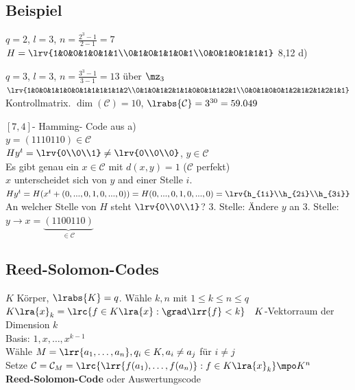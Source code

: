 	\subsection{Beispiel}
			\item $ q=2 $, $ l=3 $, $ n=\frac{2^3-1}{2-1}=7 $\\
				$ H=\lrv{1&0&0&1&0&1&1\\0&1&0&1&1&0&1\\0&0&1&0&1&1&1} $ 8,12 d)
			\item $ q=3 $, $l=3$, $n=\frac{3^3-1}{3-1}=13$ über $ \mz_3 $\\
				$ \lrv{1&0&0&1&1&0&0&1&1&1&1&1&2\\0&1&0&1&2&1&1&0&0&1&1&2&1\\0&0&1&0&0&1&2&1&2&1&2&1&1} $ Kontrollmatrix. $ \dim(\mathcal{C})=10 $, $ \lrabs{\mathcal{C}}=3^{30}=59.049 $
			\item  $ [7,4] $- Hamming- Code aus a)\\
				$ y=(1110110)\in \mathcal{C} $\\
				$ Hy^t=\lrv{0\\0\\1}\neq\lrv{0\\0\\0} $, $ y\in \mathcal{C} $\\
				Es gibt genau ein $ x\in \mathcal{C} $ mit $ d(x,y)=1 $ ($ \mathcal{C} $ perfekt)\\
				$ x $ unterscheidet sich von $ y $ and einer Stelle $ i $.\\
				$ Hy^t=H(x^t+(0,...,0,1,0,...,0))=H(0,...,0,1,0,...,0)=\lrv{h_{1i}\\h_{2i}\\h_{3i}} $\\
				An welcher Stelle von $ H $ steht $ \lrv{0\\0\\1} $? 3. Stelle: Ändere $ y $ an 3. Stelle: $ y\rightarrow x=\underbrace{(1100110)}_{\in \mathcal{C}} $
		\subExEnd
	
	\subsection{Reed-Solomon-Codes}
			\item $K$ Körper, $\lrabs{K}=q$. Wähle $k,n$ mit $1\leq k\leq n\leq q$\\
				$K\lra{x}_k=\lrc{f\in K\lra{x}: \grad\lrr{f}<k}\quad K$-Vektorraum der Dimension $k$\\
				Basis: $1,x,\dots,x^{k-1}$\\
				Wähle $M=\lrr{a_1,\dots,a_n}, q_i\in K, a_i\neq a_j$ für $i\neq j$\\
				Setze $\mathcal{C}=\mathcal{C}_M=\lrc{\lrr{f(a_1),\dots,f(a_n)}:f\in K\lra{x}_k}\mpo K^n$\\
				\textbf{Reed-Solomon-Code} oder Auswertungscode
			
